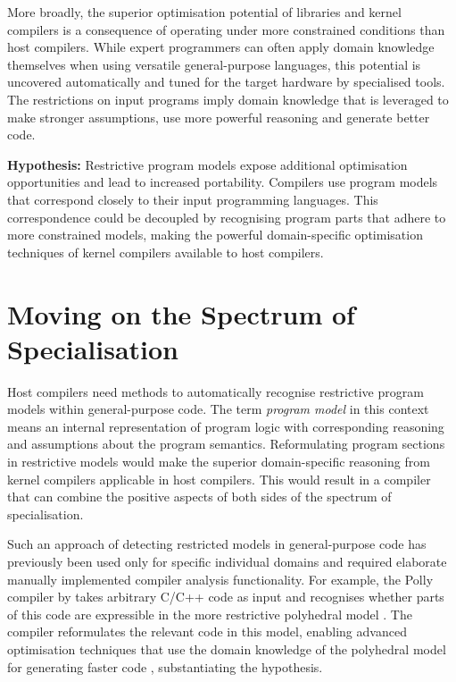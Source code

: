     More broadly, the superior optimisation potential of libraries and
    kernel compilers is a consequence of operating under more constrained
    conditions than host compilers.
    While expert programmers can often apply domain knowledge themselves
    when using versatile general-purpose languages, this potential is
    uncovered automatically and tuned for the target hardware by specialised
    tools.
    The restrictions on input programs imply domain knowledge that is leveraged
    to make stronger assumptions, use more powerful reasoning and generate
    better code.

    {\bf Hypothesis:}\quad
    Restrictive program models expose additional optimisation
    opportunities and lead to increased portability.
    Compilers use program models that correspond closely to their input
    programming languages.
    This correspondence could be decoupled by recognising program parts that
    adhere to more constrained models, making the powerful domain-specific
    optimisation techniques of kernel compilers available to host compilers.

\section{Moving on the Spectrum of Specialisation}

    Host compilers need methods to automatically recognise restrictive program
    models within general-purpose code.
    The term {\it program model} in this context means an internal
    representation of program logic with corresponding reasoning and
    assumptions about the program semantics.
    Reformulating program sections in restrictive models would make the
    superior domain-specific reasoning from kernel compilers applicable in
    host compilers.
    This would result in a compiler that can combine the positive aspects of
    both sides of the spectrum of specialisation.

    Such an approach of detecting restricted models in general-purpose code has
    previously been used only for specific individual domains and required
    elaborate manually implemented compiler analysis functionality.
    For example, the Polly compiler by \citet{Lengauer2012Polly} takes
    arbitrary C/C++ code as input and recognises whether parts of this code
    are expressible in the more restrictive polyhedral model
    \citep{Karp:1967:OCU:321406.321418,benabderrahmane2010polyhedral}.
    The compiler reformulates the relevant code in this model, enabling
    advanced optimisation techniques that use the domain knowledge of the
    polyhedral model for generating faster code
    \citep{Moll:2016:ISS:2892208.2892217,Doerfert2015Polly}, substantiating the
    hypothesis.

